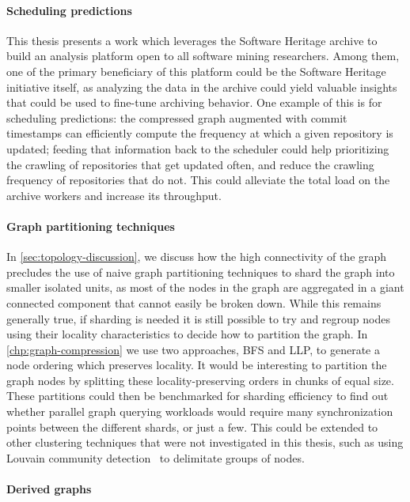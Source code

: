 \paragraph*{Scheduling predictions}

This thesis presents a work which leverages the Software Heritage archive to
build an analysis platform open to all software mining researchers. Among them,
one of the primary beneficiary of this platform could be the Software Heritage
initiative itself, as analyzing the data in the archive could yield valuable
insights that could be used to fine-tune archiving behavior. One example of
this is for scheduling predictions: the compressed graph augmented with commit
timestamps can efficiently compute the frequency at which a given repository is
updated; feeding that information back to the scheduler could help prioritizing
the crawling of repositories that get updated often, and reduce the crawling
frequency of repositories that do not. This could alleviate the total load on
the archive workers and increase its throughput.

\paragraph*{Graph partitioning techniques}

In \cref{sec:topology-discussion}, we discuss how the high connectivity of the
graph precludes the use of naive graph partitioning techniques to shard the
graph into smaller isolated units, as most of the nodes in the graph are
aggregated in a giant connected component that cannot easily be broken down.
While this remains generally true, if sharding is needed it is still possible
to try and regroup nodes using their locality characteristics to decide how to
partition the graph. In \cref{chp:graph-compression} we use two approaches,
\gls{BFS} and \gls{LLP}, to generate a node ordering which preserves locality.
It would be interesting to partition the graph nodes by splitting these
locality-preserving orders in chunks of equal size. These partitions could then
be benchmarked for sharding efficiency to find out whether parallel graph
querying workloads would require many synchronization points between the
different shards, or just a few. This could be extended to other clustering
techniques that were not investigated in this thesis, such as using Louvain
community detection~\cite{blondel2008fast} to delimitate groups of nodes.

\paragraph*{Derived graphs}

